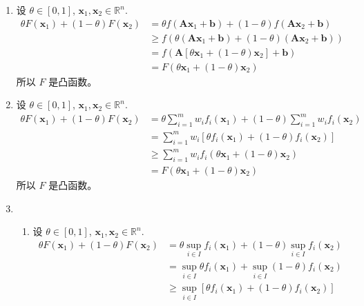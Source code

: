 \documentclass[11pt,letter,notitlepage]{article}
\theoremstyle{definition}
\begin{document}
\begin{solution}
	\begin{enumerate}
		\item 设 $\theta\in[0,1]$, $\mathbf{x}_1,\mathbf{x}_2\in\mathbb{R}^n$.
		      $$\begin{aligned}
				      \theta F(\mathbf{x}_1)+(1-\theta)F(\mathbf{x}_2)
				       & = \theta f(\mathbf{A}\mathbf{x}_1+\mathbf{b})+(1-\theta) f(\mathbf{A}\mathbf{x}_2+\mathbf{b})      \\
				       & \geq f( \theta (\mathbf{A}\mathbf{x}_1+\mathbf{b})+(1-\theta)(\mathbf{A}\mathbf{x}_2+\mathbf{b}) ) \\
				       & = f(\mathbf{A}[\theta\mathbf{x}_1+(1-\theta)\mathbf{x}_2]+\mathbf{b})                              \\
				       & = F(\theta\mathbf{x}_1+(1-\theta)\mathbf{x}_2)
			      \end{aligned}$$
		      所以 $F$ 是凸函数。
		\item 设 $\theta\in[0,1]$, $\mathbf{x}_1,\mathbf{x}_2\in\mathbb{R}^n$.
		      $$\begin{aligned}
				      \theta F(\mathbf{x}_1)+(1-\theta)F(\mathbf{x}_2)
				       & =\theta\sum_{i=1}^m w_i f_i(\mathbf{x}_1)+(1-\theta)\sum_{i=1}^m w_i f_i(\mathbf{x}_2) \\
				       & =\sum_{i=1}^m w_i \left[ \theta f_i(\mathbf{x}_1)+(1-\theta) f_i(\mathbf{x}_2) \right] \\
				       & \geq \sum_{i=1}^m w_i f_i(\theta\mathbf{x}_1+(1-\theta)\mathbf{x}_2)                   \\
				       & = F(\theta\mathbf{x}_1+(1-\theta)\mathbf{x}_2)
			      \end{aligned}$$
		      所以 $F$ 是凸函数。
		\item \begin{enumerate}
			      \item 设 $\theta\in[0,1]$, $\mathbf{x}_1,\mathbf{x}_2\in\mathbb{R}^n$.
			            $$\begin{aligned}
					            \theta F(\mathbf{x}_1)+(1-\theta)F(\mathbf{x}_2)
					             & =\theta \sup_{i\in I} f_i(\mathbf{x}_1)+(1-\theta) \sup_{i\in I} f_i(\mathbf{x}_2)      \\
					             & =\sup_{i\in I} \theta f_i(\mathbf{x}_1)+\sup_{i\in I} (1-\theta) f_i(\mathbf{x}_2)      \\
					             & \geq \sup_{i\in I} \left[ \theta f_i(\mathbf{x}_1)+ (1-\theta) f_i(\mathbf{x}_2)\right] \\

\end{aligned}$$
\end{enumerate}
\end{enumerate}
\end{solution}
\end{document}
